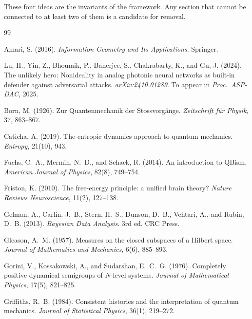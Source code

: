 \documentclass[11pt, openright, twoside]{book}
\theoremstyle{plain}
\theoremstyle{definition}
\theoremstyle{remark}
\begin{document}
These four ideas are the invariants of the framework. Any section that cannot be connected
to at least two of them is a candidate for removal.

\backmatter


\begin{thebibliography}{99}

Amari, S. (2016). \textit{Information Geometry and Its Applications}. Springer.

Lu, H., Yin, Z., Bhoumik, P., Banerjee, S., Chakrabarty, K., and Gu, J. (2024).
The unlikely hero: Nonideality in analog photonic neural networks as built-in defender
against adversarial attacks. \textit{arXiv:2410.01289}. To appear in \textit{Proc.\ ASP-DAC}, 2025.

Born, M. (1926). Zur Quantenmechanik der Stossvorg\"{a}nge.
\textit{Zeitschrift f\"{u}r Physik}, 37, 863--867.

Caticha, A. (2019). The entropic dynamics approach to quantum mechanics.
\textit{Entropy}, 21(10), 943.

Fuchs, C.~A., Mermin, N.~D., and Schack, R. (2014).
An introduction to QBism. \textit{American Journal of Physics}, 82(8), 749--754.

Friston, K. (2010). The free-energy principle: a unified brain theory?
\textit{Nature Reviews Neuroscience}, 11(2), 127--138.

Gelman, A., Carlin, J.~B., Stern, H.~S., Dunson, D.~B., Vehtari, A., and Rubin, D.~B. (2013).
\textit{Bayesian Data Analysis}. 3rd ed. CRC Press.

Gleason, A.~M. (1957). Measures on the closed subspaces of a Hilbert space.
\textit{Journal of Mathematics and Mechanics}, 6(6), 885--893.

Gorini, V., Kossakowski, A., and Sudarshan, E.~C.~G. (1976).
Completely positive dynamical semigroups of $N$-level systems.
\textit{Journal of Mathematical Physics}, 17(5), 821--825.

Griffiths, R.~B. (1984). Consistent histories and the interpretation of quantum mechanics.
\textit{Journal of Statistical Physics}, 36(1), 219--272.


\end{thebibliography}
\end{document}
